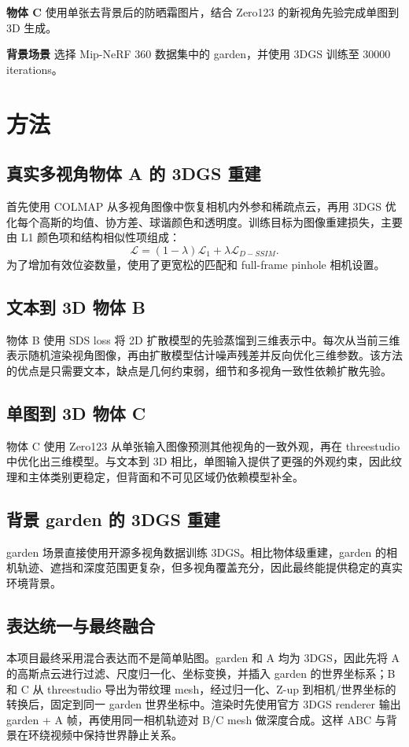 \documentclass[11pt]{article}
\begin{document}
\textbf{物体 C} 使用单张去背景后的防晒霜图片，结合 Zero123 的新视角先验完成单图到 3D 生成。

\textbf{背景场景} 选择 Mip-NeRF 360 数据集中的 garden，并使用 3DGS 训练至 30000 iterations。

\section{方法}
\subsection{真实多视角物体 A 的 3DGS 重建}
首先使用 COLMAP 从多视角图像中恢复相机内外参和稀疏点云，再用 3DGS 优化每个高斯的均值、协方差、球谐颜色和透明度。训练目标为图像重建损失，主要由 L1 颜色项和结构相似性项组成：
\begin{equation}
\mathcal{L}=(1-\lambda)\mathcal{L}_{1}+\lambda \mathcal{L}_{D-SSIM}.
\end{equation}
为了增加有效位姿数量，使用了更宽松的匹配和 full-frame pinhole 相机设置。

\subsection{文本到 3D 物体 B}
物体 B 使用 SDS loss 将 2D 扩散模型的先验蒸馏到三维表示中。每次从当前三维表示随机渲染视角图像，再由扩散模型估计噪声残差并反向优化三维参数。该方法的优点是只需要文本，缺点是几何约束弱，细节和多视角一致性依赖扩散先验。

\subsection{单图到 3D 物体 C}
物体 C 使用 Zero123 从单张输入图像预测其他视角的一致外观，再在 threestudio 中优化出三维模型。与文本到 3D 相比，单图输入提供了更强的外观约束，因此纹理和主体类别更稳定，但背面和不可见区域仍依赖模型补全。

\subsection{背景 garden 的 3DGS 重建}
garden 场景直接使用开源多视角数据训练 3DGS。相比物体级重建，garden 的相机轨迹、遮挡和深度范围更复杂，但多视角覆盖充分，因此最终能提供稳定的真实环境背景。

\subsection{表达统一与最终融合}
本项目最终采用混合表达而不是简单贴图。garden 和 A 均为 3DGS，因此先将 A 的高斯点云进行过滤、尺度归一化、坐标变换，并插入 garden 的世界坐标系；B 和 C 从 threestudio 导出为带纹理 mesh，经过归一化、Z-up 到相机/世界坐标的转换后，固定到同一 garden 世界坐标中。渲染时先使用官方 3DGS renderer 输出 garden + A 帧，再使用同一相机轨迹对 B/C mesh 做深度合成。这样 ABC 与背景在环绕视频中保持世界静止关系。
\end{document}
